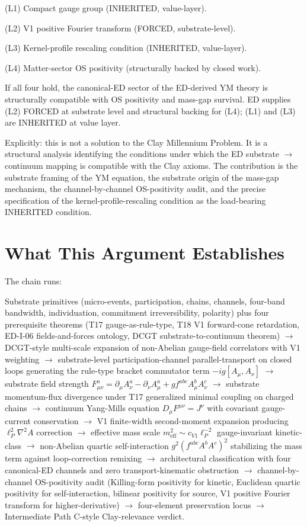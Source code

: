 \documentclass[11pt,a4paper]{article}
\begin{document}
(L1) Compact gauge group (INHERITED, value-layer).

(L2) V1 positive Fourier transform (FORCED, substrate-level).

(L3) Kernel-profile rescaling condition (INHERITED, value-layer).

(L4) Matter-sector OS positivity (structurally backed by closed work).

If all four hold, the canonical-ED sector of the ED-derived YM theory is structurally compatible with OS positivity and mass-gap survival. ED supplies (L2) FORCED at substrate level and structural backing for (L4); (L1) and (L3) are INHERITED at value layer.

Explicitly: this is not a solution to the Clay Millennium Problem. It is a structural analysis identifying the conditions under which the ED substrate $\to$ continuum mapping is compatible with the Clay axioms. The contribution is the substrate framing of the YM equation, the substrate origin of the mass-gap mechanism, the channel-by-channel OS-positivity audit, and the precise specification of the kernel-profile-rescaling condition as the load-bearing INHERITED condition.

\section{What This Argument Establishes}

The chain runs:

Substrate primitives (micro-events, participation, chains, channels, four-band bandwidth, individuation, commitment irreversibility, polarity) plus four prerequisite theorems (T17 gauge-as-rule-type, T18 V1 forward-cone retardation, ED-I-06 fields-and-forces ontology, DCGT substrate-to-continuum theorem) $\to$ DCGT-style multi-scale expansion of non-Abelian gauge-field correlators with V1 weighting $\to$ substrate-level participation-channel parallel-transport on closed loops generating the rule-type bracket commutator term $-ig[A_\mu, A_\nu]$ $\to$ substrate field strength $F_{\mu\nu}^a = \partial_\mu A_\nu^a - \partial_\nu A_\mu^a + g f^{abc} A_\mu^b A_\nu^c$ $\to$ substrate momentum-flux divergence under T17 generalized minimal coupling on charged chains $\to$ continuum Yang-Mills equation $D_\mu F^{\mu\nu} = J^\nu$ with covariant gauge-current conservation $\to$ V1 finite-width second-moment expansion producing $\ell_P^{2} \nabla^{2} A$ correction $\to$ effective mass scale $m_\mathrm{eff}^{2} \sim c_{V1} \ell_P^{-2}$ gauge-invariant kinetic-class $\to$ non-Abelian quartic self-interaction $g^{2}(f^{abc} A^b A^c)^{2}$ stabilizing the mass term against loop-correction remixing $\to$ architectural classification with four canonical-ED channels and zero transport-kinematic obstruction $\to$ channel-by-channel OS-positivity audit (Killing-form positivity for kinetic, Euclidean quartic positivity for self-interaction, bilinear positivity for source, V1 positive Fourier transform for higher-derivative) $\to$ four-element preservation locus $\to$ Intermediate Path C-style Clay-relevance verdict.
\end{document}
